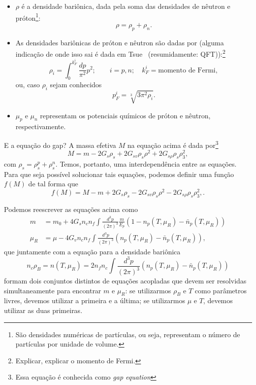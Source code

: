 \documentclass[prc, reprint, amsmath, linenumbers,10pt]{revtex4-1}
\begin{document}
\begin{itemize}
	\item $\rho$ é a densidade bariônica, dada pela soma das densidades de nêutron e próton\footnote{São densidades numéricas de partículas, ou seja, representam o número de partículas por unidade de volume.}:
	\begin{equation}
		\rho = \rho_p + \rho_n.
	\end{equation}

	\item As densidades bariônicas de próton e nêutron são dadas por (alguma indicação de onde isso sai é dada em Tsue~\cite{Lee2013} (resumidamente: QFT)):\footnote{Explicar, explicar o momento de Fermi.}
	\begin{equation}
		\rho_i = \int_0^{k_F^i}\frac{dp}{\pi^2}p^2; \qquad i = p,n; \quad k_F^i = \textrm{momento de Fermi},
	\end{equation}
	ou, caso $\rho_i$ sejam conhecidos
	\begin{equation}\label{Eq:Mom_Fermi_a_partir_de_rho}
		p_F^i = \sqrt[3]{3\pi^2\rho_i}.
	\end{equation}
	
	\item $\mu_p$ e $\mu_n$ representam os potenciais químicos de próton e nêutron, respectivamente.
\end{itemize}

E a equação do gap?
A massa efetiva $M$ na equação acima é dada por\footnote{Essa equação é conhecida como \emph{gap equation}}
\begin{equation}\label{Eq:Gap}
	M = m - 2G_s\rho_s + 2G_{sv}\rho_s\rho^2 + 2 G_{s\rho}\rho_s\rho_3^2,
\end{equation}
%
com $\rho_s = \rho_s^p + \rho_s^n$. Temos, portanto, uma interdependência entre as equações. Para que seja possível solucionar tais equações, podemos definir uma função $f(M)$ de tal forma que
\begin{equation}\label{Eq:Gap_zero}
	f(M) = M - m + 2G_s\rho_s - 2G_{sv}\rho_s\rho^2 - 2 G_{s\rho}\rho_s\rho_3^2,.
\end{equation}
%

Podemos reescrever as equações acima como
\begin{align}
	m &= m_0 + 4 G_s n_c n_f \int\frac{d^3p}{(2\pi)^3} \frac{m}{E_p} (1 - n_p(T, \mu_R) - \bar{n}_p(T, \mu_R)) \label{gap} \\
	\mu_R &= \mu - 4 G_v n_c n_f \int\frac{d^3p}{(2\pi)^3} (n_p(T, \mu_R) - \bar{n}_p(T, \mu_R)) \label{gap_mu_r},
\end{align}
%
que juntamente com a equação para a densidade bariônica
\begin{equation}\label{gap_rho}
	n_c \rho_B = n(T, \mu_R) = 2 n_f n_c\int\frac{d^3p}{(2\pi)^3}(n_p(T, \mu_R) - \bar{n}_p(T, \mu_R)) 
\end{equation}
%
formam dois conjuntos distintos de equações acopladas que devem ser resolvidas simultaneamente para encontrar $m$ e $\mu_R$: se utilizarmos $\rho_B$ e $T$ como parâmetros livres, devemos utilizar a primeira e a última; se utilizarmos $\mu$ e $T$, devemos utilizar as duas primeiras. 
\end{document}

